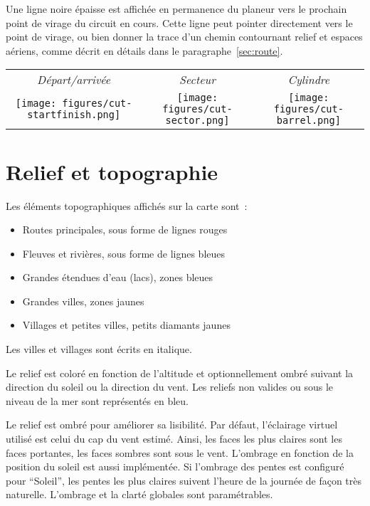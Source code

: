 Une ligne noire épaisse est affichée en permanence du planeur vers le prochain point de virage du circuit en cours.
Cette ligne peut pointer directement vers le point de virage, ou bien donner la trace d'un chemin contournant
relief et espaces aériens, comme décrit en détails dans le paragraphe~\ref{sec:route}.

\begin{center}
\begin{tabular}{c c c}
\emph{Départ/arrivée} & \emph{Secteur} & \emph{Cylindre} \\
\texttt{[image: figures/cut-startfinish.png]} &
\texttt{[image: figures/cut-sector.png]} &
\texttt{[image: figures/cut-barrel.png]}
\end{tabular}
\end{center}


\section{Relief et topographie}\label{sec:terrain_topo}

Les éléments topographiques affichés sur la carte sont~:
\begin{itemize}
\item Routes principales, sous forme de lignes rouges
\item Fleuves et rivières, sous forme de lignes bleues
\item Grandes étendues d'eau (lacs), zones bleues
\item Grandes villes, zones jaunes
\item Villages et petites villes, petits diamants jaunes
\end{itemize}
Les villes et villages sont écrits en italique.

Le relief est coloré en fonction de l'altitude et optionnellement ombré suivant la direction du soleil ou la direction du vent. Les reliefs non valides ou sous le niveau de la mer sont représentés en bleu.


Le relief est ombré pour améliorer sa lisibilité.
Par défaut, l'éclairage virtuel utilisé est celui du cap du vent estimé.
Ainsi, les faces les plus claires sont les faces portantes, les faces sombres sont sous le vent.
L'ombrage en fonction de la position du soleil est aussi implémentée.
Si l'ombrage des pentes est configuré pour ``Soleil'', les pentes les plus claires suivent l'heure de la journée de façon très naturelle.
L'ombrage et la clarté globales sont paramétrables. 

